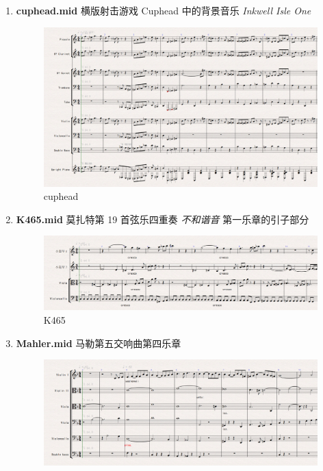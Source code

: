 \documentclass[11pt]{article}
\begin{document}
\begin{enumerate}
\item \textbf{cuphead.mid} 横版射击游戏 Cuphead 中的背景音乐 \emph{Inkwell Isle One}
\begin{figure}[hptb]
	\centering
	\label{fig:cuphead}
	\includegraphics[width=\textwidth]{pic/cuphead.eps}
	\caption{cuphead}
\end{figure}
\item \textbf{K465.mid} 莫扎特第 19 首弦乐四重奏 \emph{不和谐音} 第一乐章的引子部分
\begin{figure}[hptb]
	\centering
	\label{fig:K465}
	\includegraphics[width=\textwidth]{pic/K465.eps}
	\caption{K465}
\end{figure}
\item \textbf{Mahler.mid} 马勒第五交响曲第四乐章
\begin{figure}[hptb]
	\centering
	\label{fig:Mahler}
	\includegraphics[width=\textwidth]{pic/Mahler.eps}

\end{figure}
\end{enumerate}
\end{document}
